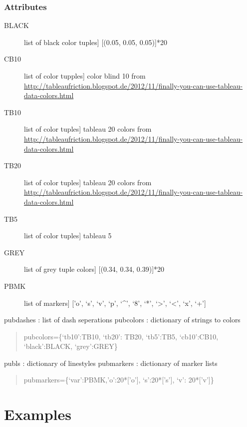 \documentclass[letterpaper,10pt,english]{sphinxmanual}
\begin{document}
\subsubsection{Attributes}
\label{pubplots:attributes}\begin{description}
\item[{BLACK}] \leavevmode{[}list of black color tuples{]}
{[}(0.05, 0.05, 0.05){]}*20

\item[{CB10}] \leavevmode{[}list of color tupples{]}
color blind 10 from
\url{http://tableaufriction.blogspot.de/2012/11/finally-you-can-use-tableau-data-colors.html}

\item[{TB10}] \leavevmode{[}list of color tuples{]}
tableau 20 colors from
\url{http://tableaufriction.blogspot.de/2012/11/finally-you-can-use-tableau-data-colors.html}

\item[{TB20}] \leavevmode{[}list of color tuples{]}
tableau 20 colors from
\url{http://tableaufriction.blogspot.de/2012/11/finally-you-can-use-tableau-data-colors.html}

\item[{TB5}] \leavevmode{[}list of color tuples{]}
tableau 5

\item[{GREY}] \leavevmode{[}list of grey tuple colors{]}
{[}(0.34, 0.34, 0.39){]}*20

\item[{PBMK}] \leavevmode{[}list of markers{]}
{[}'o', `s', `v', `p', `\textasciicircum{}', `8', `*', `\textgreater{}', `\textless{}', `x', `+'{]}

\end{description}

pubdashes : list of dash seperations
pubcolors : dictionary of strings to colors
\begin{quote}

pubcolors=\{`tb10':TB10, `tb20': TB20, `tb5':TB5, `cb10':CB10, `black':BLACK, `grey':GREY\}
\end{quote}

publs : dictionary of linestyles
pubmarkers : dictionary of marker lists
\begin{quote}

pubmarkers=\{`var':PBMK,'o':20*{[}'o'{]}, `s':20*{[}'s'{]}, `v': 20*{[}'v'{]}\}
\end{quote}


\section{Examples}
\label{pubplots:examples}
\end{document}
